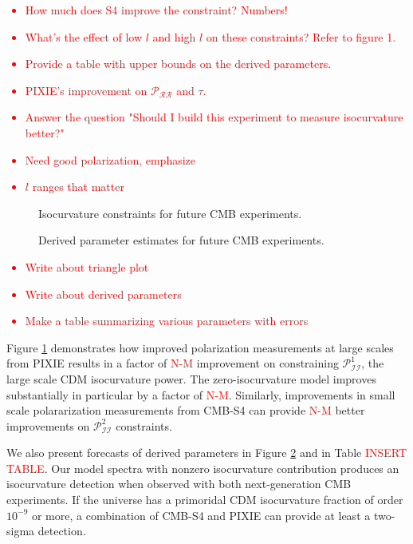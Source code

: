 \documentclass{emulateapj}
\newcommand\writingnote[1]{\textcolor{red}{#1}}
\newcommand{\prr}{ \mathcal{P}_{\mathcal{R}\mathcal{R}} }
\newcommand{\pii}{ \mathcal{P}_{\mathcal{I}\mathcal{I}} }
\begin{document}
\writingnote{
  \begin{itemize}
    \item How much does S4 improve the constraint? Numbers! 
    \item What's the effect of low $l$ and high $l$ on these constraints? Refer to figure 1. 
    \item Provide a table with upper bounds on the derived parameters.
    \item PIXIE's improvement on $\prr$ and $\tau$. 
    \item Answer the question "Should I build this experiment to measure isocurvature better?"
    \item Need good polarization, emphasize
    \item $l$ ranges that matter
  \end{itemize}
}

\afterpage{\clearpage}
\begin{figure}[p]
\caption{Isocurvature constraints for future CMB experiments.\label{fig:triangleplots}}
\end{figure}



\afterpage{\clearpage}
\begin{figure}[p]
\caption{Derived parameter estimates for future CMB experiments.\label{fig:derivedparams}}
\end{figure}

\writingnote{
    \begin{itemize}
        \item Write about triangle plot
        \item Write about derived parameters
        \item Make a table summarizing various parameters with errors
    \end{itemize}
}

Figure \ref{fig:triangleplots} demonstrates how improved polarization measurements at large scales from PIXIE results in a factor of \writingnote{N-M} improvement on constraining $\pii^1$, the large scale CDM isocurvature power. The zero-isocurvature model improves substantially in particular by a factor of \writingnote{N-M}. Similarly, improvements in small scale polararization measurements from CMB-S4 can provide \writingnote{N-M} better improvements on $\pii^2$ constraints.

We also present forecasts of derived parameters in Figure \ref{fig:derivedparams} and in Table \writingnote{INSERT TABLE}. Our model spectra with nonzero isocurvature contribution produces an isocurvature detection when observed with both next-generation CMB experiments. If the universe has a primoridal CDM isocurvature fraction of order $10^{-9}$ or more, a combination of CMB-S4 and PIXIE can provide at least a two-sigma detection. 
\end{document}
